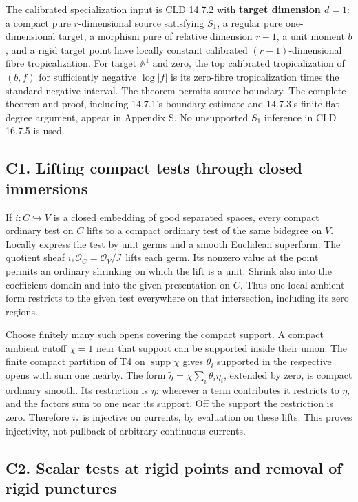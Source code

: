 \documentclass[
  10pt,
]{article}
\begin{document}
The calibrated specialization input is CLD 14.7.2 with \textbf{target
dimension \(d=1\)}: a compact pure \(r\)-dimensional source satisfying
\(S_1\), a regular pure one-dimensional target, a morphism pure of
relative dimension \(r-1\), a unit moment \(b\), and a rigid target
point have locally constant calibrated \((r-1)\)-dimensional fibre
tropicalization. For target \(\mathbb A^1\) and zero, the top calibrated
tropicalization of \((b,f)\) for sufficiently negative \(\log|f|\) is
its zero-fibre tropicalization times the standard negative interval. The
theorem permits source boundary. The complete theorem and proof,
including 14.7.1's boundary estimate and 14.7.3's finite-flat degree
argument, appear in Appendix S. No unsupported \(S_1\) inference in CLD
16.7.5 is used.

\subsection{C1. Lifting compact tests through closed
immersions}\label{c1.-lifting-compact-tests-through-closed-immersions}

If \(i:C\hookrightarrow V\) is a closed embedding of good separated
spaces, every compact ordinary test on \(C\) lifts to a compact ordinary
test of the same bidegree on \(V\). Locally express the test by unit
germs and a smooth Euclidean superform. The quotient sheaf
\(i_*\mathcal O_C=\mathcal O_V/\mathcal I\) lifts each germ. Its nonzero
value at the point permits an ordinary shrinking on which the lift is a
unit. Shrink also into the coefficient domain and into the given
presentation on \(C\). Thus one local ambient form restricts to the
given test everywhere on that intersection, including its zero regions.

Choose finitely many such opens covering the compact support. A compact
ambient cutoff \(\chi=1\) near that support can be supported inside
their union. The finite compact partition of T4 on
\(\operatorname{supp}\chi\) gives \(\theta_i\) supported in the
respective opens with sum one nearby. The form
\(\widetilde\eta=\chi\sum_i\theta_i\eta_i\), extended by zero, is
compact ordinary smooth. Its restriction is \(\eta\): wherever a term
contributes it restricts to \(\eta\), and the factors sum to one near
its support. Off the support the restriction is zero. Therefore \(i_*\)
is injective on currents, by evaluation on these lifts. This proves
injectivity, not pullback of arbitrary continuous currents.

\subsection{C2. Scalar tests at rigid points and removal of rigid
punctures}\label{c2.-scalar-tests-at-rigid-points-and-removal-of-rigid-punctures}
\end{document}
